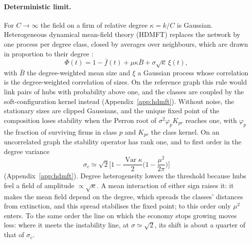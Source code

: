 \documentclass[pre,twocolumn,superscriptaddress,nofootinbib]{revtex4-2}
\newcommand{\Var}{\operatorname{Var}}
\begin{document}
\paragraph{Deterministic limit.}  For $C\to\infty$ the field on a firm of relative degree
$\kappa=k/C$ is Gaussian.  Heterogeneous dynamical mean-field theory (HDMFT) replaces the network by
one process per degree class, closed by averages over neighbours, which are drawn in proportion to
their degree \cite{aguirrelopez,patil2026}:
\begin{equation}
\Phi(t)=1-\bar f(t)+\mu\kappa\bar B+\sigma\sqrt\kappa\,\xi(t),
\label{eq:hdmft}
\end{equation}
with $\bar B$ the degree-weighted mean size and $\xi$ a Gaussian process whose correlation is the
degree-weighted correlation of sizes.  On the reference graph this rule would link pairs of hubs with
probability above one, and the classes are coupled by the soft-configuration kernel instead
\cite{patil2026} (Appendix~\ref{app:hdmft}).  Without noise, the stationary sizes
are clipped Gaussians, and the unique fixed point of the composition loses stability when the Perron
root of $\sigma^2\varphi_pK_{pr}$ reaches one, with $\varphi_p$ the fraction of surviving firms in class $p$
and $K_{pr}$ the class kernel.  On an uncorrelated graph the stability operator has rank one, and to
first order in the degree variance
\begin{equation}
\sigma_c\simeq\sqrt2\Big[1-\frac{\Var\kappa}{2}\Big(1-\frac{\mu^2}{2\pi}\Big)\Big]
\label{eq:sigmac}
\end{equation}
(Appendix~\ref{app:hdmft}).  Degree heterogeneity lowers the threshold because hubs feel a field of amplitude
$\propto\sqrt\kappa$.  A mean interaction of either sign raises it: it makes the mean field depend on the
degree, which spreads the classes' distances from extinction, and this spread stabilises the fixed point;
to this order only $\mu^2$ enters.  To the same order the line on which the
economy stops growing moves less: where it meets the instability line, at
$\sigma\simeq\sqrt2$, its shift is about a quarter of that of $\sigma_c$.
\end{document}
